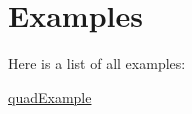 \section{Examples}
Here is a list of all examples\-:\begin{DoxyCompactItemize}
\item 
\hyperlink{quadExample-example}{quad\-Example}
\end{DoxyCompactItemize}

